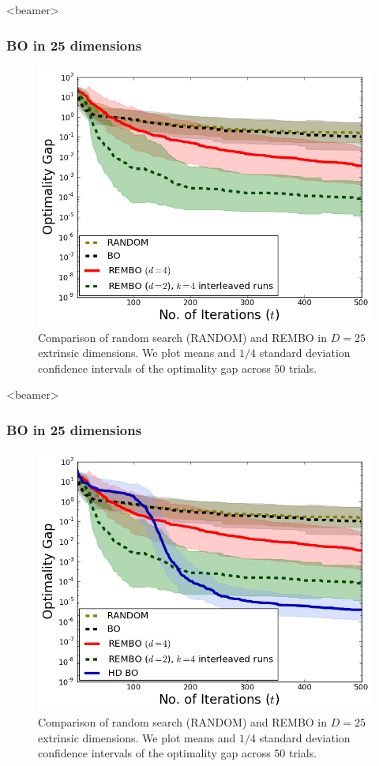 \documentclass[grey]{beamer}
\begin{document}
 
 \begin{frame}<beamer>
 \frametitle{BO in 25 dimensions}
 \begin{figure}
   \includegraphics[width=0.6\columnwidth]{./figs/branin_dis4.png}
    \caption{Comparison of random search (RANDOM) and REMBO
     in $D=25$ extrinsic dimensions. 
     We plot means and $1/4$ standard deviation confidence intervals of the optimality gap across $50$ trials.}
   \label{fig:standard}
  \end{figure}
 \end{frame}
 
 \begin{frame}<beamer>
 \frametitle{BO in 25 dimensions}
 \begin{figure}
   \includegraphics[width=0.6\columnwidth]{./figs/branin_dis5.png}
    \caption{Comparison of random search (RANDOM) and REMBO
     in $D=25$ extrinsic dimensions. 
     We plot means and $1/4$ standard deviation confidence intervals of the optimality gap across $50$ trials.}
   \label{fig:standard}
  \end{figure}
 \end{frame}
 
 
\end{document}

